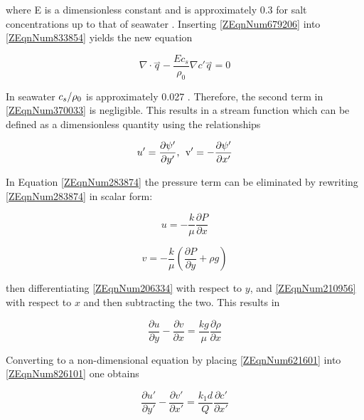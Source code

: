 \documentclass{article}
\newcommand{\pderiv}[2]{\frac{\partial #1}{\partial #2}} %
\begin{document}
where E is a dimensionless constant and is approximately 0.3 for salt
concentrations up to that of seawater \cite{Henry60}. Inserting
\eqref{ZEqnNum679206} into \eqref{ZEqnNum833854} yields the new equation

\begin{equation} \label{ZEqnNum370033} 
    \nabla \cdot \stackrel{\rightharpoonup}{q}-\frac{Ec_{s} }{\rho _{0} } 
    \nabla c'\stackrel{\rightharpoonup}{q}=0 
\end{equation}

In seawater ${c_{s} \mathord{\left/ {\vphantom {c_{s} \rho _{0} }} \right.
\kern-\nulldelimiterspace} \rho _{0} } $ is approximately 0.027 \cite{Henry60}.
Therefore, the second term in \eqref{ZEqnNum370033} is negligible. This results
in a stream function which can be defined as a dimensionless quantity using the
relationships

\begin{equation} \label{ZEqnNum615527} 
    u'=\pderiv{\psi '}{y'} \text{,\; v} '=-\pderiv{\psi '}{x'} 
\end{equation} 

In Equation \eqref{ZEqnNum283874} the pressure term can be eliminated by
rewriting \eqref{ZEqnNum283874} in scalar form:

\begin{equation} \label{ZEqnNum206334} 
    u=-\frac{k}{\mu } \pderiv{P}{x} 
\end{equation}

\begin{equation} \label{ZEqnNum210956} 
    v=-\frac{k}{\mu } \left(\pderiv{P}{y} +\rho g\right) 
\end{equation} 

then differentiating \eqref{ZEqnNum206334} with respect to $y$, and
\eqref{ZEqnNum210956} with respect to $x$ and then subtracting the two. This
results in

\begin{equation} \label{ZEqnNum826101} 
    \pderiv{u}{y} -\pderiv{v}{x} =
    \frac{kg}{\mu } \pderiv{\rho}{x} 
\end{equation}

Converting to a non-dimensional equation by placing \eqref{ZEqnNum621601} into
\eqref{ZEqnNum826101} one obtains

\begin{equation} \label{ZEqnNum965751} 
    \pderiv{u'}{y'}
    -\pderiv{v'}{x'} =\frac{k_{1} d}{Q} \pderiv{c'}{x'} 
\end{equation}
\end{document}

